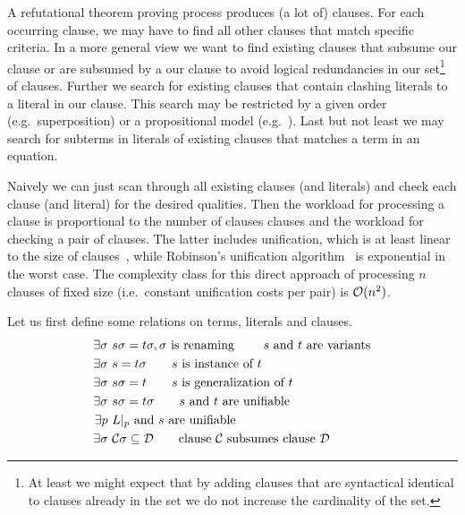 A refutational theorem proving process produces (a lot of) clauses.
For each occurring clause, we may have to find
all other clauses that match specific criteria.
In a more general view we want to find existing clauses
that subsume our clause or are subsumed by a our clause
to avoid logical redundancies in our set\footnote{
	At least we might expect that by adding clauses
	that are syntactical identical to clauses already in the set
	we do not increase the cardinality of the set.
} of clauses.
Further we search for existing clauses that contain clashing literals to a literal in our clause.
This search may be restricted by a given order (e.g.~superposition) or a propositional model (e.g.~\InstGenEQ).
Last but not least we may search for subterms in literals of existing clauses that matches a term in an equation.

Naively we can just scan through all existing clauses (and literals)
and check each clause (and literal) for the desired qualities.
	Then the workload for processing a clause is proportional to the number of clauses clauses and
	the workload for checking a pair of clauses.
	The latter includes unification, which is at least linear to the size of clauses~\cite{ALBERT19933},
	while Robinson's unification algorithm~\cite{Robinson:1965:MLB:321250.321253} is exponential in the worst case.
	The complexity class for this direct approach of processing \( n \) clauses of fixed size (i.e.~constant unification costs per pair) is \( \mathcal{O}(n^2) \).


	\begin{definition}Let us first define some relations on terms, literals and clauses.
		\begin{align*}
		\exists\sigma\ &s\sigma = t\sigma, \sigma\text{ is renaming}
		\tag*{ \(s\) and \(t\) are variants}
		\\
		\exists\sigma\ &s = t\sigma\tag*{\( s \) is instance of \( t \)}
		\\
		\exists\sigma\ &s\sigma = t\tag*{\( s \) is generalization of \( t \)}
		\\
		\exists\sigma\ &s\sigma = t\sigma
		\tag*{\(s\) and \(t\) are unifiable}
		\\
		\exists p\ &L|_p\text{ and } s \text { are unifiable}
		\\
		\exists\sigma\ &\mcC\sigma\subseteq\mcD
		\tag*{clause \(\mcC \) subsumes clause \( \mcD \)}
		\end{align*}
	\end{definition}

